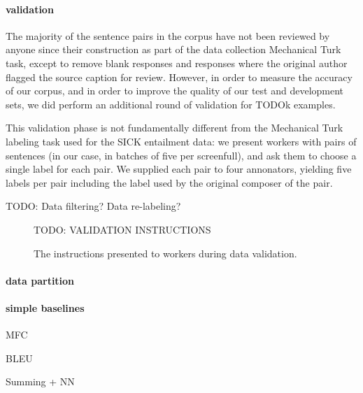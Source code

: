 \paragraph{validation}

The majority of the sentence pairs in the corpus have not been reviewed by anyone since their construction as part of the data collection Mechanical Turk task, except to remove blank responses and responses where the original author flagged the source caption for review. However, in order to measure the accuracy of our corpus, and in order to improve the quality of our test and development sets, we did perform an additional round of validation for TODOk examples.

This validation phase is not fundamentally different from the Mechanical Turk labeling task used for the SICK entailment data: we present workers with pairs of sentences (in our case, in batches of five per screenfull), and ask them to choose a single label for each pair. We supplied each pair to four annonators, yielding five labels per pair including the label used by the original composer of the pair. 

TODO: Data filtering? Data re-labeling?

\begin{figure}
\footnotesize
TODO: VALIDATION INSTRUCTIONS

\caption{\label{instructions-2}The instructions presented to workers during data validation.}
\end{figure}

\paragraph{data partition}

\paragraph{simple baselines}

MFC

BLEU

Summing + NN
